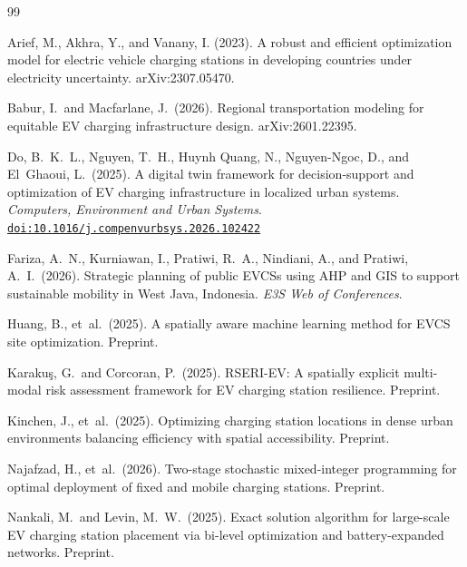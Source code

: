 \documentclass[12pt,letterpaper]{article}
\newcommand{\doi}[1]{\href{https://doi.org/#1}{\texttt{doi:#1}}}
\begin{document}

\begin{thebibliography}{99}

Arief, M., Akhra, Y., and Vanany, I. (2023).
A robust and efficient optimization model for electric vehicle charging stations in
  developing countries under electricity uncertainty.
arXiv:2307.05470.

Babur, I.\ and Macfarlane, J.\ (2026).
Regional transportation modeling for equitable EV charging infrastructure design.
arXiv:2601.22395.

Do, B.\ K.\ L., Nguyen, T.\ H., Huynh Quang, N., Nguyen-Ngoc, D., and
  El~Ghaoui, L.\ (2025).
A digital twin framework for decision-support and optimization of EV charging
  infrastructure in localized urban systems.
\textit{Computers, Environment and Urban Systems}.
\doi{10.1016/j.compenvurbsys.2026.102422}

Fariza, A.\ N., Kurniawan, I., Pratiwi, R.\ A., Nindiani, A., and
  Pratiwi, A.\ I.\ (2026).
Strategic planning of public EVCSs using AHP and GIS to support sustainable
  mobility in West Java, Indonesia.
\textit{E3S Web of Conferences}.

Huang, B., et~al.\ (2025).
A spatially aware machine learning method for EVCS site optimization.
Preprint.

Karakuş, G.\ and Corcoran, P.\ (2025).
RSERI-EV: A spatially explicit multi-modal risk assessment framework for EV
  charging station resilience.
Preprint.

Kinchen, J., et~al.\ (2025).
Optimizing charging station locations in dense urban environments balancing
  efficiency with spatial accessibility.
Preprint.

Najafzad, H., et~al.\ (2026).
Two-stage stochastic mixed-integer programming for optimal deployment of fixed
  and mobile charging stations.
Preprint.

Nankali, M.\ and Levin, M.\ W.\ (2025).
Exact solution algorithm for large-scale EV charging station placement via
  bi-level optimization and battery-expanded networks.
Preprint.


\end{thebibliography}
\end{document}
